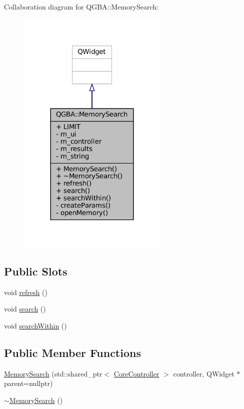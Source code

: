 Collaboration diagram for Q\+G\+BA\+:\+:Memory\+Search\+:
\nopagebreak
\begin{figure}[H]
\begin{center}
\leavevmode
\includegraphics[width=204pt]{class_q_g_b_a_1_1_memory_search__coll__graph}
\end{center}
\end{figure}
\subsection*{Public Slots}
\begin{DoxyCompactItemize}
\item 
void \mbox{\hyperlink{class_q_g_b_a_1_1_memory_search_a164cb44bd1de9560f3d8d7b892167e5c}{refresh}} ()
\item 
void \mbox{\hyperlink{class_q_g_b_a_1_1_memory_search_acf927801198317c863b8918ab85eb94f}{search}} ()
\item 
void \mbox{\hyperlink{class_q_g_b_a_1_1_memory_search_a0a52eb65f64f02317f934b410135a614}{search\+Within}} ()
\end{DoxyCompactItemize}
\subsection*{Public Member Functions}
\begin{DoxyCompactItemize}
\item 
\mbox{\hyperlink{class_q_g_b_a_1_1_memory_search_a34dd4edf1e3098dd7edcd635c077c218}{Memory\+Search}} (std\+::shared\+\_\+ptr$<$ \mbox{\hyperlink{class_q_g_b_a_1_1_core_controller}{Core\+Controller}} $>$ controller, Q\+Widget $\ast$parent=nullptr)
\item 
\mbox{\hyperlink{class_q_g_b_a_1_1_memory_search_af0f49e564aa65d3c83be4214663d8341}{$\sim$\+Memory\+Search}} ()
\end{DoxyCompactItemize}
